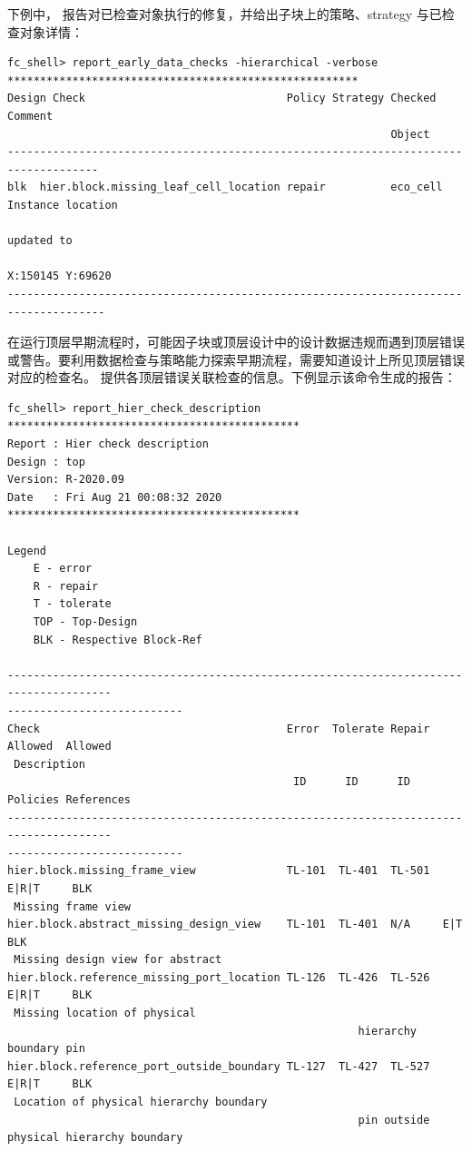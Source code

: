 下例中， 报告对已检查对象执行的修复，并给出子块上的策略、strategy 与已检查对象详情：
\begin{lstlisting}
fc_shell> report_early_data_checks -hierarchical -verbose
******************************************************
Design Check                               Policy Strategy Checked  Comment
                                                           Object
------------------------------------------------------------------------------------
blk  hier.block.missing_leaf_cell_location repair          eco_cell Instance location
                                                                    updated to
                                                                    X:150145 Y:69620
-------------------------------------------------------------------------------------
\end{lstlisting}

在运行顶层早期流程时，可能因子块或顶层设计中的设计数据违规而遇到顶层错误或警告。要利用数据检查与策略能力探索早期流程，需要知道设计上所见顶层错误对应的检查名。 提供各顶层错误关联检查的信息。下例显示该命令生成的报告：
\begin{lstlisting}
fc_shell> report_hier_check_description
*********************************************
Report : Hier check description
Design : top
Version: R-2020.09
Date   : Fri Aug 21 00:08:32 2020
*********************************************

Legend
    E - error
    R - repair
    T - tolerate
    TOP - Top-Design
    BLK - Respective Block-Ref

--------------------------------------------------------------------------------------
---------------------------
Check                                      Error  Tolerate Repair Allowed  Allowed
 Description
                                            ID      ID      ID    Policies References
--------------------------------------------------------------------------------------
---------------------------
hier.block.missing_frame_view              TL-101  TL-401  TL-501  E|R|T     BLK
 Missing frame view
hier.block.abstract_missing_design_view    TL-101  TL-401  N/A     E|T       BLK
 Missing design view for abstract
hier.block.reference_missing_port_location TL-126  TL-426  TL-526  E|R|T     BLK
 Missing location of physical
                                                      hierarchy boundary pin
hier.block.reference_port_outside_boundary TL-127  TL-427  TL-527  E|R|T     BLK
 Location of physical hierarchy boundary
                                                      pin outside physical hierarchy boundary
\end{lstlisting}

